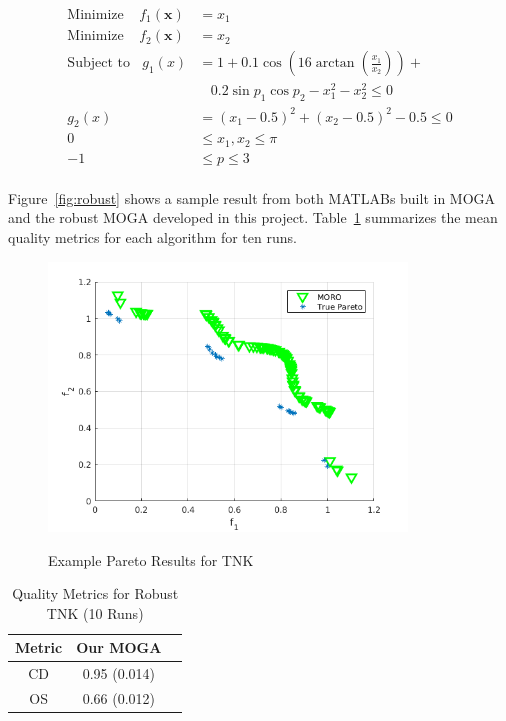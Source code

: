 \documentclass{article}
\begin{document}
\begin{align*}
\textrm{Minimize} ~~~~~ f_1(\textbf{x}) &= x_1 \\
\textrm{Minimize} ~~~~~ f_2(\textbf{x}) &= x_2 \\
\textrm{Subject to} ~~~~ g_1(x) &= 1+0.1\cos(16\arctan(\frac{x_1}{x_2})) + \\
&~~~~ 0.2\sin{p_1}\cos{p_2} -x_1^2-x_2^2\leq 0 \\
g_2(x) &= (x_1 - 0.5)^2 + (x_2 - 0.5)^2 -0.5 \leq 0 \\
0 &\leq  x_1,x_2 \leq \pi \\
-1& \leq p \leq 3\\
\end{align*}

\noindent Figure~\ref{fig:robust} shows a sample result from both MATLABs built in MOGA and the robust MOGA developed in this project. Table~\ref{tab:robustTNK} summarizes the mean quality metrics for each algorithm for ten runs. \newline
\begin{figure}[H]
  \caption{Example Pareto Results for TNK}
  \centering
  \includegraphics[width=0.85\textwidth]{prob7_nChr25_nRun400.png}  
  \label{fig:robustTNK}
\end{figure}

\begin{table}[H]
\caption{Quality Metrics for Robust TNK (10 Runs)} 
\centering 
\begin{tabular}{|c|c|c|} 
\hline\hline  
Metric &  Our MOGA \\ \hline
CD & 0.95 (0.014) \\ \hline
OS & 0.66 (0.012) \\ \hline
\end{tabular}
\label{tab:robustTNK} 
\end{table}
 
\end{document}

